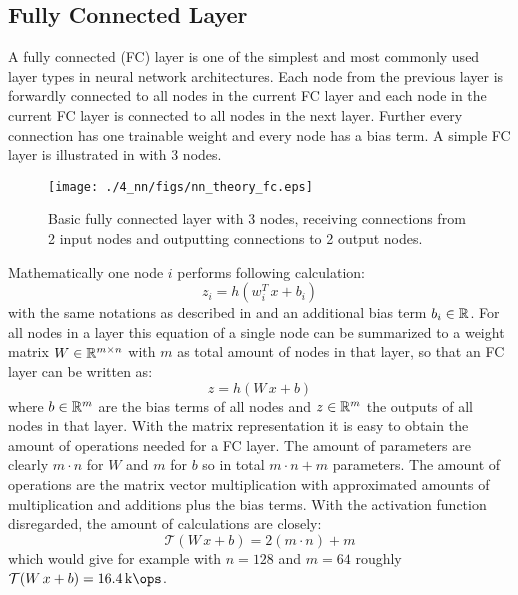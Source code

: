 \subsection{Fully Connected Layer}
A fully connected (FC) layer is one of the simplest and most commonly used layer types in neural network architectures.
Each node from the previous layer is forwardly connected to all nodes in the current FC layer and each node in the current FC layer is connected to all nodes in the next layer.
Further every connection has one trainable weight and every node has a bias term.
A simple FC layer is illustrated in  with 3 nodes.
\begin{figure}[!ht]
  \centering
    \texttt{[image: ./4\_nn/figs/nn\_theory\_fc.eps]}
  \caption{Basic fully connected layer with 3 nodes, receiving connections from 2 input nodes and outputting connections to 2 output nodes.}
  \label{fig:nn_theory_fc}
\end{figure}
\FloatBarrier
\noindent
Mathematically one node $i$ performs following calculation:
\begin{equation}
  z_i = h(w_i^T \, x + b_i)
\end{equation}
with the same notations as described in  and an additional bias term $b_i \in \mathbb{R}$.
For all nodes in a layer this equation of a single node can be summarized to a weight matrix $W \in \mathbb{R}^{m \times n}$ with $m$ as total amount of nodes in that layer, so that an FC layer can be written as:
\begin{equation}
  z = h(W \, x + b)
\end{equation}
where $b \in \mathbb{R}^m$ are the bias terms of all nodes and $z \in \mathbb{R}^m$ the outputs of all nodes in that layer.
With the matrix representation it is easy to obtain the amount of operations needed for a FC layer.
The amount of parameters are clearly $m \cdot n$ for $W$ and $m$ for $b$ so in total $m \cdot n + m$ parameters.
The amount of operations are the matrix vector multiplication with approximated amounts of multiplication and additions plus the bias terms.
With the activation function disregarded, the amount of calculations are closely:
\begin{equation} 
  \mathcal{T}(W \, x + b) = 2 (m \cdot n) + m
\end{equation}
which would give for example with $n = 128$ and $m = 64$ roughly $\mathcal{T}(W \, x + b) = \SI{16.4}{\kilo\ops}$.



